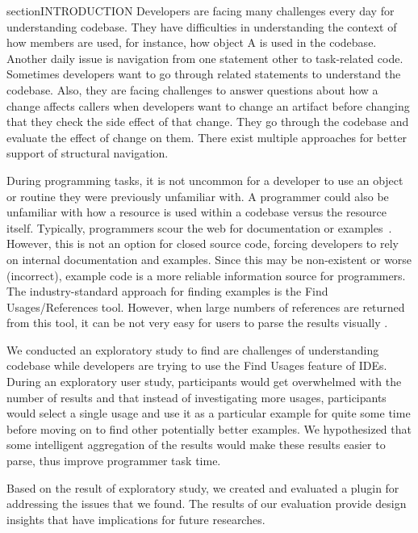 \documentclass[conference]{IEEEtran}
\begin{document}
section{INTRODUCTION}
Developers are facing many challenges every day for understanding codebase. They have difficulties in understanding the context of how members are used, for instance, how object A is used in the codebase. Another daily issue is navigation from one statement other to task-related code. Sometimes developers want to go through related statements to understand the codebase. Also, they are facing challenges to answer questions about how a change affects callers when developers want to change an artifact before changing that they check the side effect of that change. They go through the codebase and evaluate the effect of change on them. There exist multiple approaches for better support of structural navigation.\par
During programming tasks, it is not uncommon for a developer to use an object or routine they were previously unfamiliar with. A programmer could also be unfamiliar with how a resource is used within a codebase versus the resource itself. Typically, programmers scour the web for documentation or examples~\cite{brandt2009two}. However, this is not an option for closed source code, forcing developers to rely on internal documentation and examples. Since this may be non-existent or worse (incorrect), example code is a more reliable information source for programmers. The industry-standard approach for finding examples is the Find Usages/References tool. However, when large numbers of references are returned from this tool, it can be not very easy for users to parse the results visually .\par
We conducted an exploratory study to find are challenges of understanding codebase while developers are trying to use the Find Usages feature of IDEs. During an exploratory user study, participants would get overwhelmed with the number of results and that instead of investigating more usages, participants would select a single usage and use it as a particular example for quite some time before moving on to find other potentially better examples.
We hypothesized that some intelligent aggregation of the results would make these results easier to parse, thus improve programmer task time.\par
Based on the result of exploratory study, we created and evaluated a plugin for addressing the issues that we found. The results of our evaluation provide design insights that have implications for future researches.\par
\end{document}
